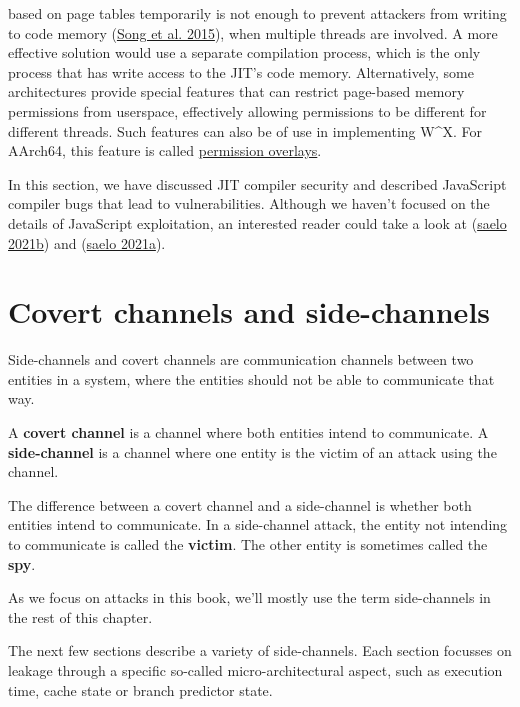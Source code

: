 \documentclass[
  a4paper,
]{report}
\begin{document}
\begin{enumerate}
  based on page tables temporarily is not enough to prevent attackers
  from writing to code memory (\protect\hyperlink{ref-Song2015}{Song et
  al. 2015}), when multiple threads are involved. A more effective
  solution would use a separate compilation process, which is the only
  process that has write access to the JIT's code memory. Alternatively,
  some architectures provide special features that can restrict
  page-based memory permissions from userspace, effectively allowing
  permissions to be different for different threads. Such features can
  also be of use in implementing W\^{}X. For AArch64, this feature is
  called
  \href{https://developer.arm.com/documentation/102376/0200/Permission-indirection-and-permission-overlay-extensions}{permission
  overlays}.
\end{enumerate}

In this section, we have discussed JIT compiler security and described
JavaScript compiler bugs that lead to vulnerabilities. Although we
haven't focused on the details of JavaScript exploitation, an interested
reader could take a look at (\protect\hyperlink{ref-saelo2021a}{saelo
2021b}) and (\protect\hyperlink{ref-saelo2021b}{saelo 2021a}).

\hypertarget{covert-channels-and-side-channels}{%
\chapter{Covert channels and
side-channels}\label{covert-channels-and-side-channels}}

Side-channels and covert channels are communication channels between two
entities in a system, where the entities should not be able to
communicate that way.

A \textbf{covert channel} is a channel where both
entities intend to communicate. A
\textbf{side-channel} is a channel where one entity
is the victim of an attack using the channel.

The difference between a covert channel and a side-channel is whether
both entities intend to communicate. In a side-channel attack, the
entity not intending to communicate is called the
\textbf{victim}. The other entity is sometimes called the
\textbf{spy}.

As we focus on attacks in this book, we'll mostly use the term
side-channels in the rest of this chapter.

The next few sections describe a variety of side-channels. Each section
focusses on leakage through a specific so-called micro-architectural
aspect, such as execution time, cache state
or branch predictor state.
\end{document}
